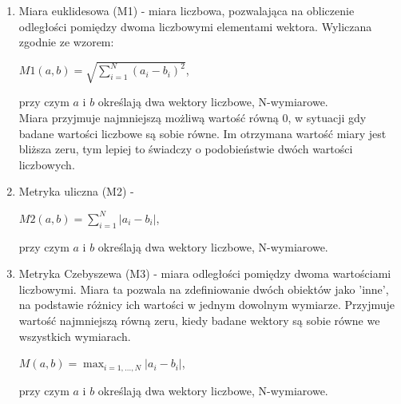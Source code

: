\documentclass{classrep}
\begin{document}
\begin{enumerate}
  \item Miara euklidesowa (M1) - miara liczbowa, pozwalająca na obliczenie odległości pomiędzy dwoma liczbowymi elementami wektora. Wyliczana zgodnie ze wzorem:
  \begin{center}
    $M1(a, b) = \sqrt{\sum_{i=1}^{N}(a_i - b_i)^2}$,\\
  \end{center}
  przy czym $a$ i $b$ określają dwa wektory liczbowe, N-wymiarowe.\\
  Miara przyjmuje najmniejszą możliwą wartość równą 0, w sytuacji gdy badane wartości liczbowe są sobie równe.
  Im otrzymana wartość miary jest bliższa zeru, tym lepiej to świadczy o podobieństwie dwóch wartości liczbowych. \\
  \item Metryka uliczna (M2) - 
  \begin{center}
    $M2(a, b) = \sum_{i=1}^{N} |a_i - b_i|$, \\
  \end{center}
  przy czym $a$ i $b$ określają dwa wektory liczbowe, N-wymiarowe.\\
  \item Metryka Czebyszewa (M3) - miara odległości pomiędzy dwoma wartościami liczbowymi. Miara ta pozwala na zdefiniowanie dwóch obiektów jako 'inne', na podstawie różnicy ich wartości w jednym dowolnym wymiarze.
  Przyjmuje wartość najmniejszą równą zeru, kiedy badane wektory są sobie równe we wszystkich wymiarach. \\
  \begin{center}
    $M(a, b) = \max_{i=1, ..., N} |a_i - b_i|$, \\
  \end{center}
  przy czym $a$ i $b$ określają dwa wektory liczbowe, N-wymiarowe.\\
\end{enumerate} 


\end{document}
